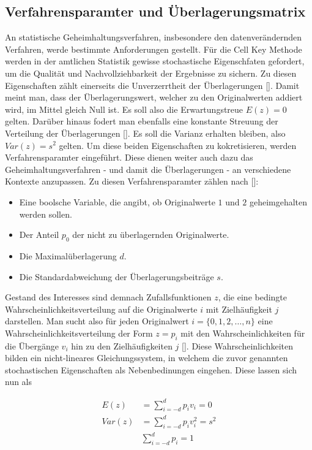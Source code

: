 \subsection{Verfahrensparamter und Überlagerungsmatrix}

An statistische Geheimhaltungsverfahren, insbesondere den datenverändernden Verfahren, werde bestimmte Anforderungen gestellt. Für die Cell Key Methode werden in der amtlichen Statistik gewisse stochastische Eigenschfaten gefordert, um die Qualität und Nachvollziehbarkeit der Ergebnisse zu sichern. Zu diesen Eigenschaften zählt einerseits die Unverzerrtheit der Überlagerungen [\cite{Enderle}]. Damit meint man, dass der Überlagerungswert, welcher zu den Originalwerten addiert wird, im Mittel gleich Null ist. Es soll also die Erwartungstreue $E(z) = 0$ gelten. Darüber hinaus fodert man ebenfalls eine konstante Streuung der Verteilung der Überlagerungen [\cite{Enderle}]. Es soll die Varianz erhalten bleiben, also $Var(z) = s^2$ gelten. Um diese beiden Eigenschaften zu kokretisieren, werden Verfahrensparamter eingeführt. Diese dienen weiter auch dazu das Geheimhaltungsverfahren - und damit die Überlagerungen - an verschiedene Kontexte anzupassen. Zu diesen Verfahrensparamter zählen nach [\cite{Höhne}]:

\begin{itemize}
    \item Eine boolsche Variable, die angibt, ob Originalwerte $1$ und $2$ geheimgehalten werden sollen.
    \item Der Anteil $p_0$ der nicht zu überlagernden Originalwerte.
    \item Die Maximalüberlagerung $d$.
    \item Die Standardabweichung der Überlagerungsbeiträge $s$.
\end{itemize}

Gestand des Interesses sind demnach Zufallsfunktionen $z$, die eine bedingte Wahrscheinlichkeitsverteilung auf die Originalwerte $i$ mit Zielhäufigkeit $j$ darstellen. Man sucht also für jeden Originalwert $i = \{0, 1, 2, \dots, n \}$ eine Wahrscheinlichkeitsverteilung der Form $z = p_i$ mit den Wahrscheinlichkeiten für die Übergänge $v_i$ hin zu den Zielhäufigkeiten $j$ [\cite{Enderle}]. Diese Wahrscheinlichkeiten bilden ein nicht-lineares Gleichungssystem, in welchem die zuvor genannten stochastischen Eigenschaften als Nebenbedinungen eingehen. Diese lassen sich nun als 

\begin{align}
    E(z) & = \sum_{i = -d}^{d} p_i v_i = 0 \\
    Var(z) & = \sum_{i = -d}^{d} p_i v_{i}^{2} = s^2 \\
    & \sum_{i = -d}^{d} p_i = 1
\end{align}

